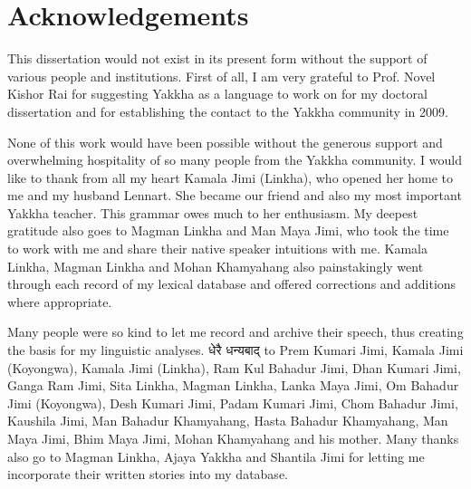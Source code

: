 ﻿%
\frontmatter
\maketitle



\tableofcontents 


\chapter*{Acknowledgements}

This dissertation would not exist in its present form without the support of various people and institutions. First of all, I am very grateful to Prof. Novel Kishor Rai for suggesting Yakkha as a language to work on for my doctoral dissertation and for establishing the contact to the Yakkha community in 2009.

None of this work would have been possible without the generous support and overwhelming hospitality of so many people from the Yakkha community. I would like to thank from all my heart Kamala  Jimi (Linkha), who opened her home to me and my husband Lennart. She became our friend and also my most important Yakkha teacher. This grammar owes much to her enthusiasm. My deepest gratitude also goes to Magman Linkha and Man Maya Jimi, who took the time to work with me and share their native speaker intuitions with me. Kamala Linkha, Magman Linkha and Mohan Khamyahang also painstakingly went through each record of my lexical database and offered corrections and additions where appropriate.

Many people were so kind to let me record and archive their speech, thus creating the basis for my linguistic analyses. {\Deva धेरै धन्यबाद्} to Prem Kumari Jimi, Kamala Jimi (Koyongwa), Kamala Jimi (Linkha), Ram Kul Bahadur Jimi, Dhan Kumari Jimi, Ganga Ram Jimi, Sita Linkha, Magman Linkha, Lanka Maya Jimi, Om Bahadur Jimi (Koyongwa), Desh Kumari Jimi, Padam Kumari Jimi, Chom Bahadur Jimi, Kaushila Jimi, Man Bahadur Khamyahang, Hasta Bahadur Khamyahang, Man Maya  Jimi, Bhim Maya  Jimi, Mohan Khamyahang and his mother. Many thanks also go to Magman Linkha, Ajaya Yakkha and Shantila Jimi for letting me incorporate their written stories into my database.   
 
